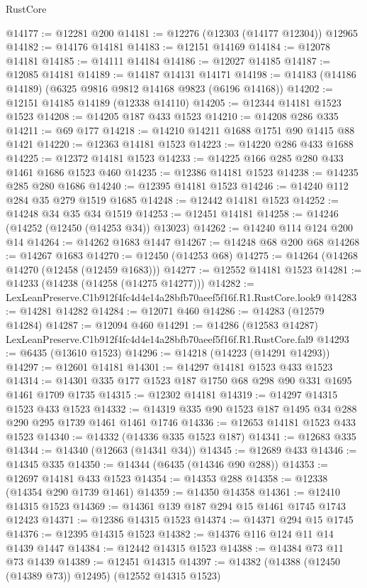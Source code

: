 \begin{lexlean}{RustCore}
\begin{coremodule}
@14177 := @12281 @200
@14181 := @12276 (@12303 (@14177 @12304)) @12965
@14182 := @14176 @14181
@14183 := @12151 @14169
@14184 := @12078 @14181
@14185 := @14111 @14184
@14186 := @12027 @14185
@14187 := @12085 @14181
@14189 := @14187 @14131 @14171
@14198 := @14183 (@14186 @14189) (@6325 @9816 @9812 @14168 @9823 (@6196 @14168))
@14202 := @12151 @14185 @14189 (@12338 @14110)
@14205 := @12344 @14181 @1523 @1523
@14208 := @14205 @187 @433 @1523
@14210 := @14208 @286 @335
@14211 := @69 @177
@14218 := @14210 @14211 @1688 @1751 @90 @1415 @88 @1421
@14220 := @12363 @14181 @1523
@14223 := @14220 @286 @433 @1688
@14225 := @12372 @14181 @1523
@14233 := @14225 @166 @285 @280 @433 @1461 @1686 @1523 @460
@14235 := @12386 @14181 @1523
@14238 := @14235 @285 @280 @1686
@14240 := @12395 @14181 @1523
@14246 := @14240 @112 @284 @35 @279 @1519 @1685
@14248 := @12442 @14181 @1523
@14252 := @14248 @34 @35 @34 @1519
@14253 := @12451 @14181
@14258 := @14246 (@14252 (@12450 (@14253 @34)) @13023)
@14262 := @14240 @114 @124 @200 @14
@14264 := @14262 @1683 @1447
@14267 := @14248 @68 @200 @68
@14268 := @14267 @1683
@14270 := @12450 (@14253 @68)
@14275 := @14264 (@14268 @14270 (@12458 (@12459 @1683)))
@14277 := @12552 @14181 @1523
@14281 := @14233 (@14238 (@14258 (@14275 @14277)))
@14282 := LexLeanPreserve.C1b912f4fc4d4e14a28bfb70aeef5f16f.R1.RustCore.look9
@14283 := @14281 @14282
@14284 := @12071 @460
@14286 := @14283 (@12579 @14284)
@14287 := @12094 @460
@14291 := @14286 (@12583 @14287) LexLeanPreserve.C1b912f4fc4d4e14a28bfb70aeef5f16f.R1.RustCore.fal9
@14293 := @6435 (@13610 @1523)
@14296 := @14218 (@14223 (@14291 @14293))
@14297 := @12601 @14181
@14301 := @14297 @14181 @1523 @433 @1523
@14314 := @14301 @335 @177 @1523 @187 @1750 @68 @298 @90 @331 @1695 @1461 @1709 @1735
@14315 := @12302 @14181
@14319 := @14297 @14315 @1523 @433 @1523
@14332 := @14319 @335 @90 @1523 @187 @1495 @34 @288 @290 @295 @1739 @1461 @1461 @1746
@14336 := @12653 @14181 @1523 @433 @1523
@14340 := @14332 (@14336 @335 @1523 @187)
@14341 := @12683 @335
@14344 := @14340 (@12663 (@14341 @34))
@14345 := @12689 @433
@14346 := @14345 @335
@14350 := @14344 (@6435 (@14346 @90 @288))
@14353 := @12697 @14181 @433 @1523
@14354 := @14353 @288
@14358 := @12338 (@14354 @290 @1739 @1461)
@14359 := @14350 @14358
@14361 := @12410 @14315 @1523
@14369 := @14361 @139 @187 @294 @15 @1461 @1745 @1743 @12423
@14371 := @12386 @14315 @1523
@14374 := @14371 @294 @15 @1745
@14376 := @12395 @14315 @1523
@14382 := @14376 @116 @124 @11 @14 @1439 @1447
@14384 := @12442 @14315 @1523
@14388 := @14384 @73 @11 @73 @1439
@14389 := @12451 @14315
@14397 := @14382 (@14388 (@12450 (@14389 @73)) @12495) (@12552 @14315 @1523)

\end{coremodule}
\end{lexlean}
